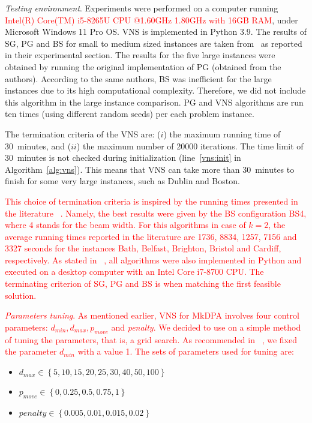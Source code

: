 \documentclass[dvipsnames,format=sigconf]{acmart} %
\begin{document}
 \emph{Testing environment}. Experiments were performed on a computer running \textcolor{red}{Intel(R) Core(TM) i5-8265U CPU @1.60GHz 1.80GHz with 16GB RAM}, under Microsoft Windows 11 Pro OS. VNS is implemented in Python 3.9. The results of SG, PG and BS for small to medium sized instances are taken from~\cite{corcoran2021heuristics} as reported in their experimental section. The results for the five large instances were obtained by running the original implementation of PG (obtained from the authors). According to the same authors, BS was inefficient for the large instances due to its high computational complexity. Therefore, we did not include this algorithm in the large instance comparison.  
 PG and VNS algorithms are run ten times (using different random seeds) per each problem instance. 
   
  The termination criteria of the VNS are: ($i$) the maximum running time of 30~minutes, and ($ii$) the maximum number of 20000 iterations. The time limit of 30~minutes is not checked during initialization (line~\ref{vns:init} in Algorithm~\ref{alg:vns}). This means that VNS can take more than 30~minutes to finish for some very large instances, such as Dublin and Boston. 
  
  \textcolor{red}{This choice of termination criteria is inspired by the running times presented in the literature ~\cite{corcoran2021heuristics}. Namely, the best results were given by the BS configuration BS4, where 4 stands for the beam width. For this algorithms in case of $k=2$, the average running times reported in the literature are 1736, 8834, 1257, 7156 and 3327 seconds for the instances Bath, Belfast, Brighton, Bristol and Cardiff, respectively.} \textcolor{red}{As stated in ~\cite{corcoran2021heuristics}, all algorithms were also implemented in  Python and executed on a desktop computer with an Intel Core i7-8700 CPU. The  terminating criterion of SG, PG and BS is when matching the first feasible solution.}
   

   \textcolor{red}{\emph{Parameters tuning}. As mentioned earlier, VNS for MkDPA involves four control parameters: $d_{min}, d_{max}, p_{move}$ and \emph{penalty}. We decided to use on a simple method of tuning the parameters, that is, a grid search. As recommended in  ~\cite{mladenovic1997variable}, we fixed the parameter $d_{min}$ with a value 1. The sets of parameters used for tuning are:}

	\begin{itemize}
		\item $d_{max}\in{\left\lbrace 5, 10, 15, 20, 25, 30, 40, 50, 100\right\rbrace }$
		\item $p_{move}\in{\left\lbrace 0, 0.25, 0.5, 0.75, 1\right\rbrace }$
		\item $penalty\in{\left\lbrace 0.005, 0.01, 0.015, 0.02\right\rbrace }$
	\end{itemize}
\end{document}
